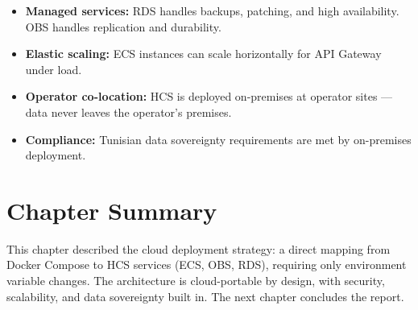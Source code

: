 \begin{itemize}
  \item \textbf{Managed services:} RDS handles backups, patching, and high availability. OBS handles replication and durability.
  \item \textbf{Elastic scaling:} ECS instances can scale horizontally for API Gateway under load.
  \item \textbf{Operator co-location:} HCS is deployed on-premises at operator sites --- data never leaves the operator's premises.
  \item \textbf{Compliance:} Tunisian data sovereignty requirements are met by on-premises deployment.
\end{itemize}

\section{Chapter Summary}

This chapter described the cloud deployment strategy: a direct mapping from Docker Compose to HCS services (ECS, OBS, RDS), requiring only environment variable changes. The architecture is cloud-portable by design, with security, scalability, and data sovereignty built in. The next chapter concludes the report.
